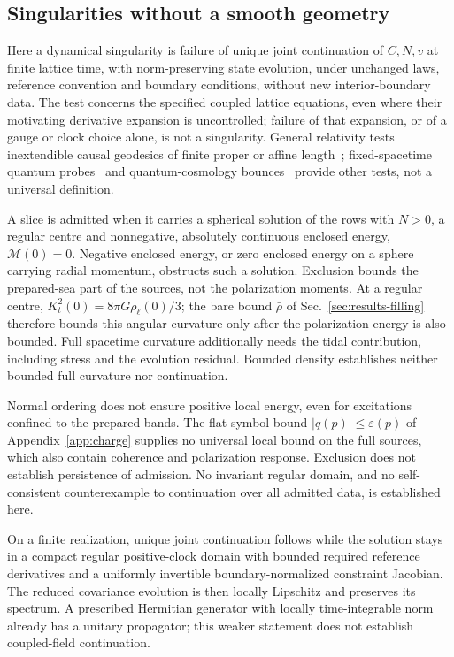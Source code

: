 \subsection{Singularities without a smooth geometry}\label{sec:singularity}

Here a dynamical singularity is failure of unique joint continuation
of \(C,N,v\) at finite lattice time, with norm-preserving state
evolution, under unchanged laws, reference convention and boundary
conditions, without new interior-boundary data. The test concerns
the specified coupled lattice equations, even where their motivating
derivative expansion is uncontrolled; failure of that expansion,
or of a gauge or clock choice alone, is not a singularity.
General relativity tests inextendible causal geodesics of finite
proper or affine length~\cite{ChoquetBruhat2009}; fixed-spacetime
quantum probes~\cite{HorowitzMarolf1995} and quantum-cosmology
bounces~\cite{AshtekarPawlowskiSingh2006} provide other tests,
not a universal definition.

A slice is admitted when it carries a spherical solution of the
rows with \(N>0\), a regular centre and nonnegative, absolutely
continuous enclosed energy, \(\mathcal M(0)=0\). Negative enclosed
energy, or zero enclosed energy on a sphere carrying radial
momentum, obstructs such a solution. Exclusion bounds the
prepared-sea part of the sources, not the polarization moments.
At a regular centre,
\(K_t^2(0)=8\pi G\rho_\ell(0)/3\); the bare bound
\(\bar\rho\) of Sec.~\ref{sec:results-filling} therefore bounds
this angular curvature only after the polarization energy is
also bounded. Full spacetime curvature additionally needs the
tidal contribution, including stress and the evolution residual.
Bounded density establishes neither bounded full curvature nor
continuation.

Normal ordering does not ensure positive local energy, even for
excitations confined to the prepared bands. The flat symbol bound
\(|q(p)|\le\varepsilon(p)\) of Appendix~\ref{app:charge} supplies
no universal local bound on the full sources, which also contain
coherence and polarization response. Exclusion does not establish
persistence of admission. No invariant regular domain, and no
self-consistent counterexample to continuation over all admitted
data, is established here.

On a finite realization, unique joint continuation follows while
the solution stays in a compact regular positive-clock domain
with bounded required reference derivatives and a uniformly
invertible boundary-normalized constraint Jacobian. The reduced
covariance evolution is then locally Lipschitz and preserves its
spectrum. A prescribed Hermitian generator with locally
time-integrable norm already has a unitary propagator; this
weaker statement does not establish coupled-field continuation.

